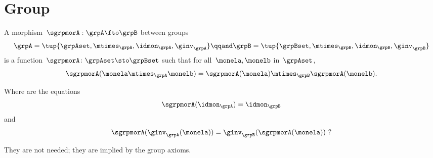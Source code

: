 \section{Group \whomos}


\begin{ctdefinition}
    \label{def:group-mor}
    A morphism~$\sgrpmorA: \grpA \fto \grpB$ between groups
    \begin{equation}
        \grpA = \tup{\grpAset, \mtimes_\grpA, \idmon_\grpA, \ginv_\grpA}
        \qqand
        \grpB = \tup{\grpBset, \mtimes_\grpB, \idmon_\grpB,  \ginv_\grpB}
    \end{equation}
    is a function~$\sgrpmorA \colon \grpAset \sto \grpBset$ such that
    for all~$\monela, \monelb$ in~$\grpAset$,
    \begin{equation}
        \label{eq:group-mor-comp}
        \sgrpmorA (\monela \mtimes_{\grpA} \monelb) = \sgrpmorA (\monela) \mtimes_{\grpB}  \sgrpmorA(\monelb).
    \end{equation}
\end{ctdefinition}

Where are the equations
\begin{equation}
    \label{eq:grp-id-comp}
    \sgrpmorA (\idmon_\grpA) = \idmon_{\grpB}
\end{equation}
and
\begin{equation}
    \label{eq:grp-inv-comp}
    \sgrpmorA (\ginv_\grpA(\monela)) = \ginv_\grpB(\sgrpmorA(\monela)) \ ?
\end{equation}

They are not needed; they are implied by the group axioms.

